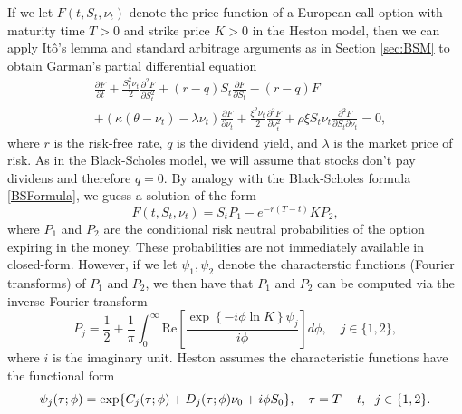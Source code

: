 If we let $F(t,S_{t},\nu_{t})$ denote the price function of a European call option with maturity time $T>0$ and strike price $K>0$ in the Heston model, then we can apply Itô's lemma and standard arbitrage arguments as in Section \ref{sec:BSM} to obtain Garman's partial differential equation
\begin{align*}
    &\frac{\partial F}{\partial t} + \frac{S_{t}^{2}\nu_{t}}{2}\frac{\partial^{2}F}{\partial S_{t}^{2}} + (r-q)S_{t}\frac{\partial F}{\partial S_{t}} - (r-q)F\\
    &+ \left(\kappa(\theta - \nu_{t})-\lambda \nu_{t}\right)\frac{\partial F}{\partial \nu_{t}} + \frac{\xi^{2}\nu_{t}}{2}\frac{\partial^{2}F}{\partial \nu_{t}^{2}} + \rho\xi S_{t}\nu_{t}\frac{\partial^{2}F}{\partial S_{t}\partial \nu_{t}}=0,
\end{align*}
where $r$ is the risk-free rate, $q$ is the dividend yield, and $\lambda$ is the market price of risk. As in the Black-Scholes model, we will assume that stocks don't pay dividens and therefore $q=0$. By analogy with the Black-Scholes formula \eqref{BSFormula}, we guess a solution of the form
\begin{equation}
    F(t,S_{t},\nu_{t})=S_{t}P_{1} - e^{-r(T-t)}KP_{2},
\end{equation}
where $P_{1}$ and $P_{2}$ are the conditional risk neutral probabilities of the option expiring in the money. These probabilities are not immediately available in closed-form.
However, if we let $\psi_{1},\psi_{2}$ denote the characterstic functions (Fourier transforms) of $P_{1}$ and $P_{2}$, we then have that $P_{1}$ and $P_{2}$ can be computed via the inverse Fourier transform
\begin{equation}
    P_{j}=\frac{1}{2}+\frac{1}{\pi}\int_{0}^{\infty}\textrm{Re}\left[\frac{\exp\left\{-i\phi \ln K\right\}\psi_{j}}{i\phi}\right]d\phi, \quad j\in \{1,2\},
\end{equation}
where $i$ is the imaginary unit. Heston assumes the characteristic functions have the functional form
\begin{equation}
    \psi_{j}(\tau; \phi)=\exp\left\{C_{j}(\tau;\phi)+D_{j}(\tau;\phi)\nu_{0}+i\phi S_{0}\right\},\quad \tau=T-t, \hspace{6 pt}j\in\{1,2\}.
\end{equation}
